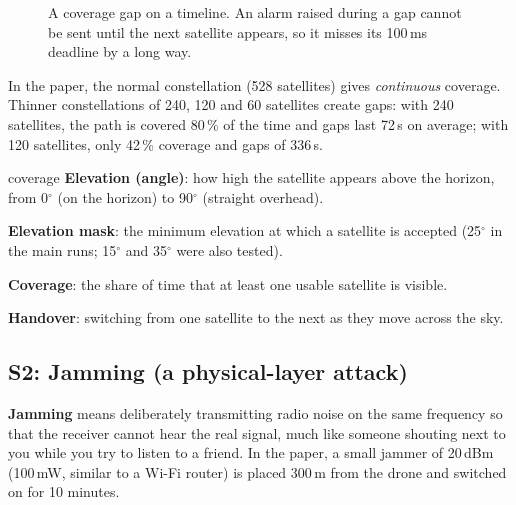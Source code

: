 \documentclass[11pt,a4paper]{article}
\newcommand{\kt}[1]{\textbf{\color{navy}#1}}
\begin{document}
\begin{figure}[h]
\centering
{}
\caption{A coverage gap on a timeline. An alarm raised during a gap cannot be sent until the next satellite appears, so it misses its 100\,ms deadline by a long way.}\label{fig:gap}
\end{figure}

In the paper, the normal constellation (528 satellites) gives \emph{continuous} coverage. Thinner constellations of 240, 120 and 60 satellites create gaps: with 240 satellites, the path is covered 80\,\% of the time and gaps last 72\,s on average; with 120 satellites, only 42\,\% coverage and gaps of 336\,s.

\begin{term}{coverage}
\kt{Elevation (angle)}: how high the satellite appears above the horizon, from 0$^\circ$ (on the horizon) to 90$^\circ$ (straight overhead).\par
\kt{Elevation mask}: the minimum elevation at which a satellite is accepted (25$^\circ$ in the main runs; 15$^\circ$ and 35$^\circ$ were also tested).\par
\kt{Coverage}: the share of time that at least one usable satellite is visible.\par
\kt{Handover}: switching from one satellite to the next as they move across the sky.
\end{term}

\subsection{S2: Jamming (a physical-layer attack)}

\kt{Jamming} means deliberately transmitting radio noise on the same frequency so that the receiver cannot hear the real signal, much like someone shouting next to you while you try to listen to a friend. In the paper, a small jammer of 20\,dBm (100\,mW, similar to a Wi-Fi router) is placed 300\,m from the drone and switched on for 10 minutes.
\end{document}
